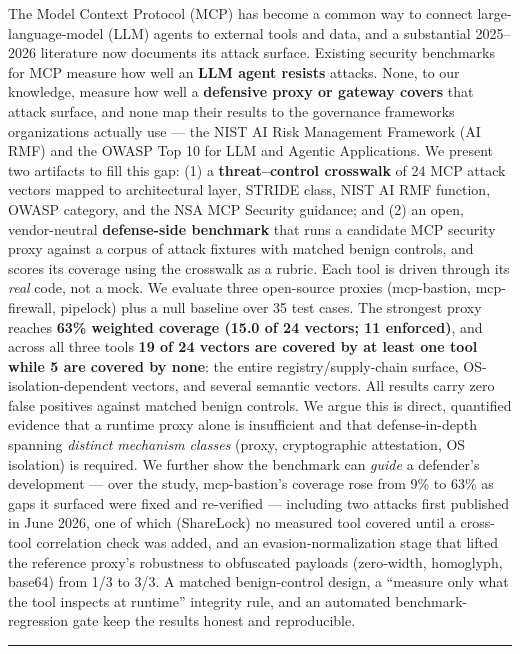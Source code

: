 \documentclass[
]{article}
\newcounter{none} %
\begin{document}
The Model Context Protocol (MCP) has become a common way to connect
large-language-model (LLM) agents to external tools and data, and a
substantial 2025--2026 literature now documents its attack surface.
Existing security benchmarks for MCP measure how well an \textbf{LLM
agent resists} attacks. None, to our knowledge, measure how well a
\textbf{defensive proxy or gateway covers} that attack surface, and none
map their results to the governance frameworks organizations actually
use --- the NIST AI Risk Management Framework (AI RMF) and the OWASP Top
10 for LLM and Agentic Applications. We present two artifacts to fill
this gap: (1) a \textbf{threat--control crosswalk} of 24 MCP attack
vectors mapped to architectural layer, STRIDE class, NIST AI RMF
function, OWASP category, and the NSA MCP Security guidance; and (2) an
open, vendor-neutral \textbf{defense-side benchmark} that runs a
candidate MCP security proxy against a corpus of attack fixtures with
matched benign controls, and scores its coverage using the crosswalk as
a rubric. Each tool is driven through its \emph{real} code, not a mock.
We evaluate three open-source proxies (mcp-bastion, mcp-firewall,
pipelock) plus a null baseline over 35 test cases. The strongest proxy
reaches \textbf{63\% weighted coverage (15.0 of 24 vectors; 11
enforced)}, and across all three tools \textbf{19 of 24 vectors are
covered by at least one tool while 5 are covered by none}: the entire
registry/supply-chain surface, OS-isolation-dependent vectors, and
several semantic vectors. All results carry zero false positives against
matched benign controls. We argue this is direct, quantified evidence
that a runtime proxy alone is insufficient and that defense-in-depth
spanning \emph{distinct mechanism classes} (proxy, cryptographic
attestation, OS isolation) is required. We further show the benchmark
can \emph{guide} a defender's development --- over the study,
mcp-bastion's coverage rose from 9\% to 63\% as gaps it surfaced were
fixed and re-verified --- including two attacks first published in June
2026, one of which (ShareLock) no measured tool covered until a
cross-tool correlation check was added, and an evasion-normalization
stage that lifted the reference proxy's robustness to obfuscated
payloads (zero-width, homoglyph, base64) from 1/3 to 3/3. A matched
benign-control design, a ``measure only what the tool inspects at
runtime'' integrity rule, and an automated benchmark-regression gate
keep the results honest and reproducible.

\begin{center}\rule{0.5\linewidth}{0.5pt}\end{center}
\end{document}
